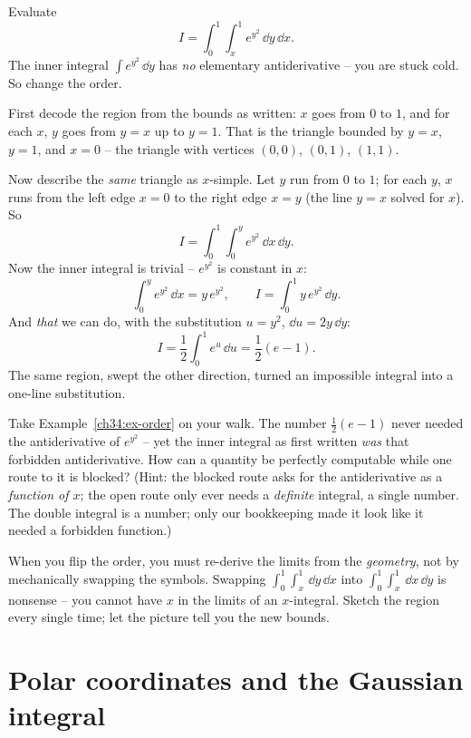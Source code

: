 \begin{example}
\label{ch34:ex-order}
Evaluate
\[
  I=\int_0^1\!\int_x^1 e^{y^2}\,\dd y\,\dd x .
\]
The inner integral $\int e^{y^2}\,\dd y$ has \emph{no} elementary
antiderivative -- you are stuck cold. So change the order.

First decode the region from the bounds as written: $x$ goes from $0$ to $1$,
and for each $x$, $y$ goes from $y=x$ up to $y=1$. That is the triangle bounded
by $y=x$, $y=1$, and $x=0$ -- the triangle with vertices $(0,0)$, $(0,1)$,
$(1,1)$.

Now describe the \emph{same} triangle as $x$-simple. Let $y$ run from $0$ to $1$;
for each $y$, $x$ runs from the left edge $x=0$ to the right edge $x=y$ (the line
$y=x$ solved for $x$). So
\[
  I=\int_0^1\!\int_0^y e^{y^2}\,\dd x\,\dd y .
\]
Now the inner integral is trivial -- $e^{y^2}$ is constant in $x$:
\[
  \int_0^y e^{y^2}\,\dd x=y\,e^{y^2},
  \qquad
  I=\int_0^1 y\,e^{y^2}\,\dd y .
\]
And \emph{that} we can do, with the substitution $u=y^2$, $\dd u=2y\,\dd y$:
\[
  I=\frac12\int_0^1 e^{u}\,\dd u=\frac12(e-1).
\]
The same region, swept the other direction, turned an impossible integral into a
one-line substitution.
\end{example}

\begin{walkbox}
Take Example~\ref{ch34:ex-order} on your walk. The number $\tfrac12(e-1)$ never
needed the antiderivative of $e^{y^2}$ -- yet the inner integral as first written
\emph{was} that forbidden antiderivative. How can a quantity be perfectly
computable while one route to it is blocked? (Hint: the blocked route asks for
the antiderivative as a \emph{function of $x$}; the open route only ever needs a
\emph{definite} integral, a single number. The double integral is a number; only
our bookkeeping made it look like it needed a forbidden function.)
\end{walkbox}

\begin{trapbox}
When you flip the order, you must re-derive the limits from the \emph{geometry},
not by mechanically swapping the symbols. Swapping
$\int_0^1\!\int_x^1\,\dd y\,\dd x$ into $\int_0^1\!\int_x^1\,\dd x\,\dd y$ is
nonsense -- you cannot have $x$ in the limits of an $x$-integral. Sketch the
region every single time; let the picture tell you the new bounds.
\end{trapbox}

\section{Polar coordinates and the Gaussian integral}
\label{ch34:polar}

